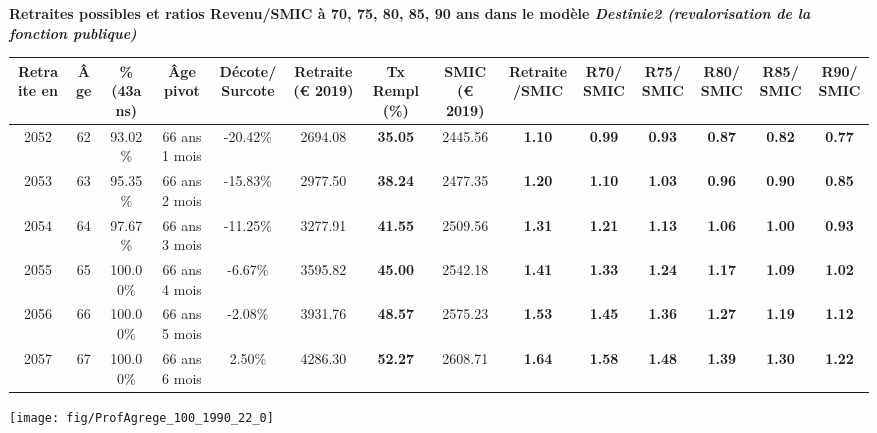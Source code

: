  \vspace{0.1cm} 
{\bf \noindent Retraites possibles et ratios Revenu/SMIC à 70, 75, 80, 85, 90 ans dans le modèle \emph{Destinie2 (revalorisation de la fonction publique)}}  
 
\begin{adjustbox}{max width=\textwidth} 
\begin{tabular}[htb]{|c|c||c|c|c||c|c||c|c||c|c|c|c|c|} 
\hline 
 Retraite en &  Âge &  \%(43ans) &  Âge pivot &  Décote/Surcote &  Retraite (\euro{} 2019) &  Tx Rempl(\%) &  SMIC (\euro{} 2019) &  Retraite/SMIC &  R70/SMIC &  R75/SMIC &  R80/SMIC &  R85/SMIC &  R90/SMIC \\ 
\hline \hline 
 2052 &  62 &  93.02\% &  66 ans 1 mois &  -20.42\% &  2694.08 &  {\bf 35.05} &  2445.56 &  {\bf 1.10} &  {\bf {\color{red} 0.99}} &  {\bf {\color{red} 0.93}} &  {\bf {\color{red} 0.87}} &  {\bf {\color{red} 0.82}} &  {\bf {\color{red} 0.77}} \\ 
\hline 
 2053 &  63 &  95.35\% &  66 ans 2 mois &  -15.83\% &  2977.50 &  {\bf 38.24} &  2477.35 &  {\bf 1.20} &  {\bf 1.10} &  {\bf 1.03} &  {\bf {\color{red} 0.96}} &  {\bf {\color{red} 0.90}} &  {\bf {\color{red} 0.85}} \\ 
\hline 
 2054 &  64 &  97.67\% &  66 ans 3 mois &  -11.25\% &  3277.91 &  {\bf 41.55} &  2509.56 &  {\bf 1.31} &  {\bf 1.21} &  {\bf 1.13} &  {\bf 1.06} &  {\bf {\color{red} 1.00}} &  {\bf {\color{red} 0.93}} \\ 
\hline 
 2055 &  65 &  100.00\% &  66 ans 4 mois &  -6.67\% &  3595.82 &  {\bf 45.00} &  2542.18 &  {\bf 1.41} &  {\bf 1.33} &  {\bf 1.24} &  {\bf 1.17} &  {\bf 1.09} &  {\bf 1.02} \\ 
\hline 
 2056 &  66 &  100.00\% &  66 ans 5 mois &  -2.08\% &  3931.76 &  {\bf 48.57} &  2575.23 &  {\bf 1.53} &  {\bf 1.45} &  {\bf 1.36} &  {\bf 1.27} &  {\bf 1.19} &  {\bf 1.12} \\ 
\hline 
 2057 &  67 &  100.00\% &  66 ans 6 mois &  2.50\% &  4286.30 &  {\bf 52.27} &  2608.71 &  {\bf 1.64} &  {\bf 1.58} &  {\bf 1.48} &  {\bf 1.39} &  {\bf 1.30} &  {\bf 1.22} \\ 
\hline 
\hline 
\end{tabular} 
\end{adjustbox} 
 
 \vspace{0.1cm} 

 {\hspace{-2.2cm}\texttt{[image: fig/ProfAgrege\_100\_1990\_22\_0]}} 

